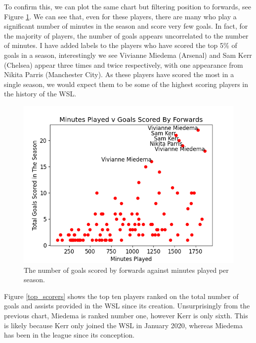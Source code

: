 \documentclass[12pt, a4paper, twocolumn]{article}
\begin{document}
To confirm this, we can plot the same chart but filtering position to forwards, see Figure \ref{goal_min_fw}. We can see that, even for these players, there are many who play a significant number of minutes in the season and score very few goals. In fact, for the majority of players, the number of goals appears uncorrelated to the number of minutes. I have added labels to the players who have scored the top 5\% of goals in a season, interestingly we see Vivianne Miedema (Arsenal) and Sam Kerr (Chelsea) appear three times and twice respectively, with one appearance from Nikita Parris (Manchester City). As these players have scored the most in a single season, we would expect them to be some of the highest scoring players in the history of the WSL.

\begin{figure}
  \includegraphics[width=\linewidth]{../vis/playerStats/goal_minutes_forwards.png}
  \caption{The number of goals scored by forwards against minutes played per season.}
  \label{goal_min_fw}
\end{figure}

Figure \ref{top_scorers} shows the top ten players ranked on the total number of goals and assists provided in the WSL since its creation. Unsurprisingly from the previous chart, Miedema is ranked number one, however Kerr is only sixth. This is likely because Kerr only joined the WSL in January 2020, whereas Miedema has been in the league since its conception. 
\end{document}
